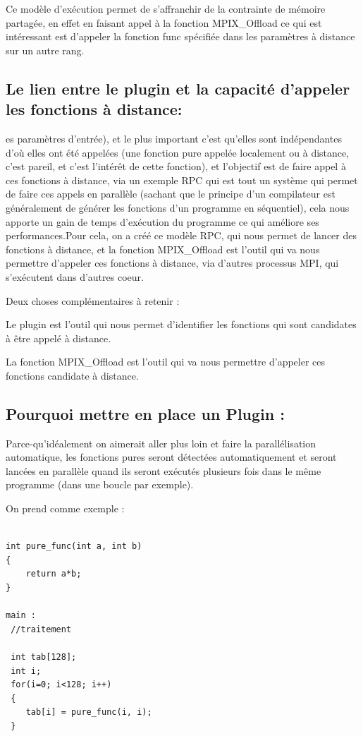 \documentclass[12pt,a4paper]{article}
\begin{document}
Ce modèle d'exécution permet de s'affranchir de la contrainte de mémoire partagée, en effet en faisant appel à la fonction MPIX\_Offload ce qui est intéressant est d'appeler la fonction func spécifiée dans les paramètres à distance sur un autre rang.

\subsection{Le lien entre le plugin et la capacité d'appeler les fonctions à distance:}
es paramètres d'entrée), et le plus important c'est qu'elles sont indépendantes d'où elles ont été appelées (une fonction pure appelée localement ou à distance, c'est pareil, et c'est l'intérêt de cette fonction), et l'objectif est de faire appel à ces fonctions à distance, via un exemple RPC qui est tout un système qui permet de faire ces appels en parallèle (sachant que le principe d'un compilateur est généralement de générer les fonctions d'un programme en séquentiel), cela nous apporte un gain de temps d’exécution du programme ce qui améliore ses performances.Pour cela, on a créé ce modèle RPC, qui nous permet de lancer des fonctions à distance, et la fonction MPIX\_Offload est l'outil qui va nous permettre d'appeler ces fonctions à distance, via d'autres processus MPI, qui s'exécutent dans d'autres coeur.

Deux choses complémentaires à retenir :

Le plugin est l'outil qui nous permet d'identifier les fonctions qui sont candidates à être appelé à distance.

La fonction MPIX\_Offload est l'outil qui va nous permettre d'appeler ces fonctions candidate à distance.

\subsection{Pourquoi mettre en place un Plugin :}

Parce-qu'idéalement on aimerait aller plus loin et faire la parallélisation automatique, les fonctions pures seront détectées automatiquement et seront lancées en parallèle quand ils seront exécutés plusieurs fois dans le même programme (dans une boucle par exemple).

On prend comme exemple :

\begin{lstlisting}

int pure_func(int a, int b)
{
    return a*b;
}

main : 
 //traitement 

 int tab[128];
 int i;
 for(i=0; i<128; i++)
 {
 	tab[i] = pure_func(i, i);
 }
\end{lstlisting}
\end{document}
